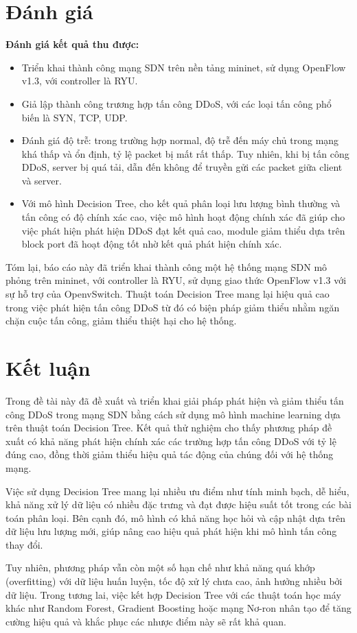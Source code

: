 \documentclass[a4paper]{article}
\begin{document}
\section{Đánh giá}
\textbf{Đánh giá kết quả thu được:}
\begin{itemize}
    \item Triển khai thành công mạng SDN trên nền tảng mininet, sử dụng OpenFlow v1.3, với controller là RYU.
    \item Giả lập thành công trương hợp tấn công DDoS, với các loại tấn công phổ biến là SYN, TCP, UDP. 
    \item Đánh giá độ trễ: trong trường hợp normal, độ trễ đến máy chủ trong mạng khá thấp và ổn định, tỷ lệ packet bị mất rất thấp. Tuy nhiên, khi bị tấn công DDoS, server bị quá tải, dẫn đến không để truyền gửi các packet giữa client và server. 
    \item Với mô hình Decision Tree, cho kết quả phân loại lưu lượng bình thường và tấn công có độ chính xác cao, việc mô hình hoạt động chính xác đã giúp cho việc phát hiện phát hiện DDoS đạt kết quả cao, module giảm thiểu dựa trên block port đã hoạt động tốt nhờ kết quả phát hiện chính xác. 
\end{itemize}
    Tóm lại, báo cáo này đã triển khai thành công một hệ thống mạng SDN mô phỏng trên mininet, với controller là RYU, sử dụng giao thức OpenFlow v1.3 với sự hỗ trợ của OpenvSwitch. Thuật toán Decision Tree mang lại hiệu quả cao trong việc phát hiện tấn công DDoS từ đó có biện pháp giảm thiểu nhằm ngăn chặn cuộc tấn công, giảm thiểu thiệt hại cho hệ thống.
\section{Kết luận}
Trong đề tài này đã đề xuất và triển khai giải pháp phát hiện và giảm thiểu tấn công DDoS trong mạng SDN bằng cách sử dụng mô hình machine learning dựa trên thuật toán Decision Tree. Kết quả thử nghiệm cho thấy phương pháp đề xuất có khả năng phát hiện chính xác các trường hợp tấn công DDoS với tỷ lệ đúng cao, đồng thời giảm thiểu hiệu quả tác động của chúng đối với hệ thống mạng.

Việc sử dụng Decision Tree mang lại nhiều ưu điểm như tính minh bạch, dễ hiểu, khả năng xử lý dữ liệu có nhiều đặc trưng và đạt được hiệu suất tốt trong các bài toán phân loại. Bên cạnh đó, mô hình có khả năng học hỏi và cập nhật dựa trên dữ liệu lưu lượng mới, giúp nâng cao hiệu quả phát hiện khi mô hình tấn công thay đổi.

Tuy nhiên, phương pháp vẫn còn một số hạn chế như khả năng quá khớp (overfitting) với dữ liệu huấn luyện, tốc độ xử lý chưa cao, ảnh hưởng nhiều bởi dữ liệu. Trong tương lai, việc kết hợp Decision Tree với các thuật toán học máy khác như Random Forest, Gradient Boosting hoặc mạng Nơ-ron nhân tạo để tăng cường hiệu quả và khắc phục các nhược điểm này sẽ rất khả quan.
\end{document}
